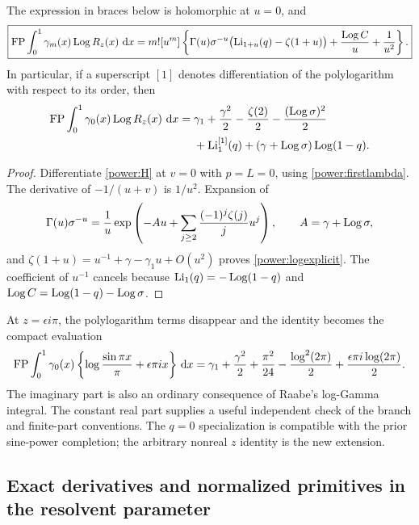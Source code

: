 \begin{corollary}
\label{power:logcor}
The expression in braces below is holomorphic at $u=0$, and
\begin{equation}\label{power:alllog}
 \boxed{\displaystyle
 \operatorname{FP}\int_0^1\gamma_m(x)\operatorname{Log} R_z(x)\,\mathop{}\!\mathrm{d} x
 =m![u^m]\left\{
 \Gamma(u)\sigma^{-u}\bigl(\operatorname{Li}_{1+u}(q)-\zeta(1+u)\bigr)
       +\frac{\operatorname{Log} C}{u}+\frac1{u^2}\right\}.}
\end{equation}
In particular, if a superscript $[1]$ denotes differentiation of the
polylogarithm with respect to its order, then
\begin{align}\label{power:logexplicit}
 \operatorname{FP}\int_0^1\gamma_0(x)\operatorname{Log} R_z(x)\,\mathop{}\!\mathrm{d} x
  ={}&\gamma_1+\frac{\gamma^2}{2}-\frac{\zeta(2)}2
              -\frac{(\operatorname{Log}\sigma)^2}{2}\notag\\
    &+\operatorname{Li}_1^{[1]}(q)
               +(\gamma+\operatorname{Log}\sigma)\operatorname{Log}(1-q).
\end{align}
\end{corollary}
\begin{proof}
Differentiate \eqref{power:H} at $v=0$ with $p=L=0$, using
\eqref{power:firstlambda}.  The derivative of $-1/(u+v)$ is
$1/u^2$.  Expansion of
\[
 \Gamma(u)\sigma^{-u}
 =\frac1u\exp\left(-Au+\sum_{j\ge2}\frac{(-1)^j\zeta(j)}j u^j\right),
 \qquad A=\gamma+\operatorname{Log}\sigma,
\]
and $\zeta(1+u)=u^{-1}+\gamma-\gamma_1u+O(u^2)$ proves
\eqref{power:logexplicit}.  The coefficient of $u^{-1}$ cancels
because $\operatorname{Li}_1(q)=-\operatorname{Log}(1-q)$ and
$\operatorname{Log} C=\operatorname{Log}(1-q)-\operatorname{Log}\sigma$.
\end{proof}

At $z=\epsilon i\pi$, the polylogarithm terms disappear and the
identity becomes the compact evaluation
\begin{equation}\label{power:logspecial}
 \operatorname{FP}\int_0^1\gamma_0(x)
       \left\{\log\frac{\sin\pi x}{\pi}+\epsilon\pi ix\right\}\,\mathop{}\!\mathrm{d} x
 =\gamma_1+\frac{\gamma^2}{2}+\frac{\pi^2}{24}
       -\frac{\log^2(2\pi)}2+\frac{\epsilon\pi i\log(2\pi)}2.
\end{equation}
The imaginary part is also an ordinary consequence of Raabe's
log-Gamma integral.  The constant real part supplies a useful
independent check of the branch and finite-part conventions.
The $q=0$ specialization is compatible with the prior sine-power
completion; the arbitrary nonreal $z$ identity is the new extension.

\subsection{Exact derivatives and normalized primitives in the resolvent parameter}

